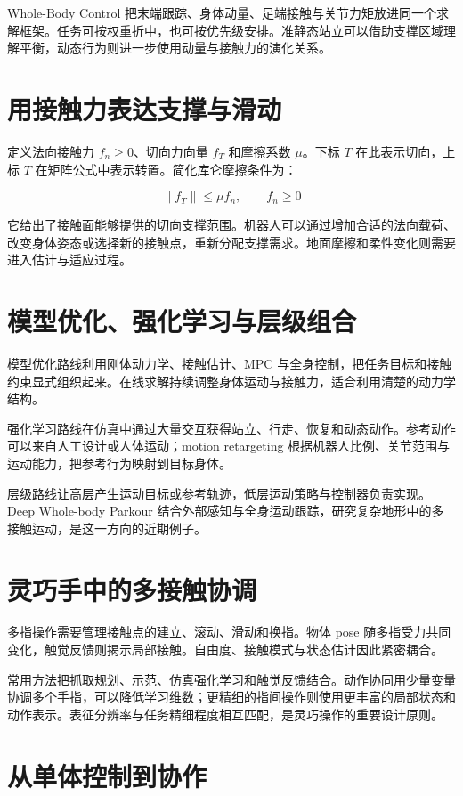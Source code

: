 \documentclass[UTF8,a4paper,11pt,oneside,openany,fontset=none]{ctexbook}
\begin{document}
Whole-Body Control 把末端跟踪、身体动量、足端接触与关节力矩放进同一个求解框架。任务可按权重折中，也可按优先级安排。准静态站立可以借助支撑区域理解平衡，动态行为则进一步使用动量与接触力的演化关系。

\section{用接触力表达支撑与滑动}

定义法向接触力 \(f_n\ge0\)、切向力向量 \(f_{T}\) 和摩擦系数 \(\mu\)。下标 \(T\) 在此表示切向，上标 \(T\) 在矩阵公式中表示转置。简化库仑摩擦条件为：

\[
\|f_T\|\le\mu f_n,\qquad f_n\ge0
\]

它给出了接触面能够提供的切向支撑范围。机器人可以通过增加合适的法向载荷、改变身体姿态或选择新的接触点，重新分配支撑需求。地面摩擦和柔性变化则需要进入估计与适应过程。

\section{模型优化、强化学习与层级组合}

模型优化路线利用刚体动力学、接触估计、MPC 与全身控制，把任务目标和接触约束显式组织起来。在线求解持续调整身体运动与接触力，适合利用清楚的动力学结构。

强化学习路线在仿真中通过大量交互获得站立、行走、恢复和动态动作。参考动作可以来自人工设计或人体运动；motion retargeting 根据机器人比例、关节范围与运动能力，把参考行为映射到目标身体。

层级路线让高层产生运动目标或参考轨迹，低层运动策略与控制器负责实现。Deep Whole-body Parkour 结合外部感知与全身运动跟踪，研究复杂地形中的多接触运动，是这一方向的近期例子。\cite{R34}

\section{灵巧手中的多接触协调}

多指操作需要管理接触点的建立、滚动、滑动和换指。物体 pose 随多指受力共同变化，触觉反馈则揭示局部接触。自由度、接触模式与状态估计因此紧密耦合。

常用方法把抓取规划、示范、仿真强化学习和触觉反馈结合。动作协同用少量变量协调多个手指，可以降低学习维数；更精细的指间操作则使用更丰富的局部状态和动作表示。表征分辨率与任务精细程度相互匹配，是灵巧操作的重要设计原则。

\section{从单体控制到协作}
\end{document}
